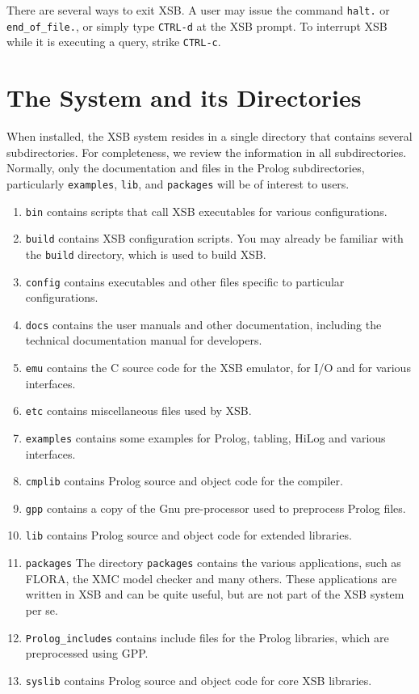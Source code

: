 There are several ways to exit XSB.  A user may issue the
command \verb'halt.' or \verb'end_of_file.', or simply type
\verb'CTRL-d' at the XSB prompt.  To interrupt XSB
while it is executing a query, strike \verb'CTRL-c'.

\section{The System and its Directories}
When installed, the XSB system resides in a single directory that
contains several subdirectories.  For completeness, we review the
information in all subdirectories.  Normally, only the documentation
and files in the Prolog subdirectories, particularly {\tt examples},
{\tt lib}, and {\tt packages} will be of interest to users.
\begin{enumerate}
\item {\tt bin} contains scripts that call XSB executables
for various configurations.
%
\item {\tt build} contains XSB configuration scripts.  You may
already be familiar with the {\tt build} directory, which is used to
build XSB.
%
\item {\tt config} contains executables and other files specific to
particular configurations.
%
\item {\tt docs} contains the user manuals and other documentation,
including the technical documentation manual for developers.  
%
\item {\tt emu} contains the C source code for the XSB emulator, for
I/O and for various interfaces.
%
\item {\tt etc} contains miscellaneous files used by XSB.
%
\item {\tt examples} contains some examples for Prolog, tabling,
HiLog and various interfaces.
%
\item {\tt cmplib} contains Prolog source and object code for the
compiler. 
%
\item {\tt gpp} contains a copy of the Gnu pre-processor used to
preprocess Prolog files.
%
\item {\tt lib} contains Prolog source and object code for extended
libraries. 
%
\item {\tt packages} The directory {\tt packages} contains the various
applications, such as FLORA, the XMC model checker and many others.
These applications are written in XSB and can be quite useful, but are
not part of the XSB system per se.
%
\item {\tt Prolog\_includes} contains include files for the Prolog
libraries, which are preprocessed using GPP.
%
\item {\tt syslib} contains Prolog source and object code for core XSB
libraries. 
\end{enumerate}

